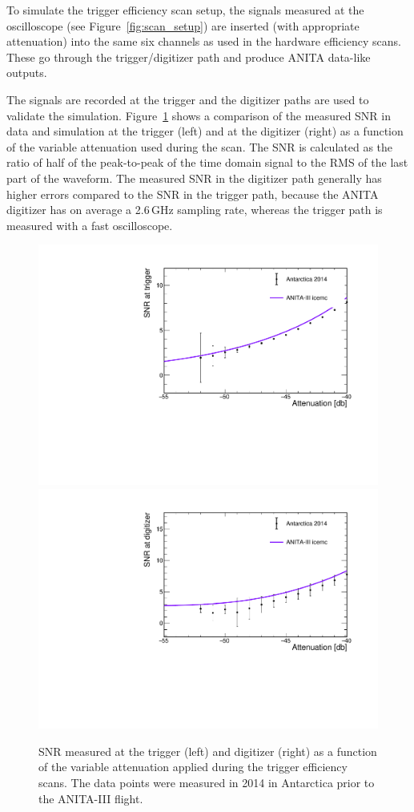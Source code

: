 To simulate the trigger efficiency scan setup, the signals
measured at the oscilloscope (see Figure~\ref{fig:scan_setup}) 
are inserted (with appropriate attenuation) into the same six channels as used
in the hardware efficiency scans.
These go through the trigger/digitizer path and produce ANITA
data-like outputs.

The signals are recorded at the trigger and the digitizer paths
are used to validate the simulation.
Figure~\ref{fig:scan_snr} shows a comparison of the measured SNR in
data and simulation at the trigger (left) and at
the digitizer (right) as a function of the variable attenuation used
during the scan.
The SNR is calculated as the ratio of half of the peak-to-peak of the
time domain signal to the RMS of the last part of the waveform.
The measured SNR in the digitizer path generally has higher errors compared to the SNR in the trigger path, because the ANITA digitizer has on average a
2.6\,GHz sampling rate, whereas the trigger path is measured with a
fast oscilloscope. 

\begin{figure}[!h]\centering
  \includegraphics[width=.45\linewidth]{./Figs/EfficiencyScanNoDelaysA3_snrTriggerVSattenuation.pdf} 
  \includegraphics[width=.45\linewidth]{./Figs/EfficiencyScanNoDelaysA3_snrDigitizerVSattenuation.pdf}
  \caption{SNR measured at the trigger (left) and digitizer (right) as
  a function of the variable attenuation applied during the trigger
  efficiency scans. The data points were measured in 2014 in Antarctica prior to the
  ANITA-III flight.
}
  \label{fig:scan_snr}
\end{figure}

